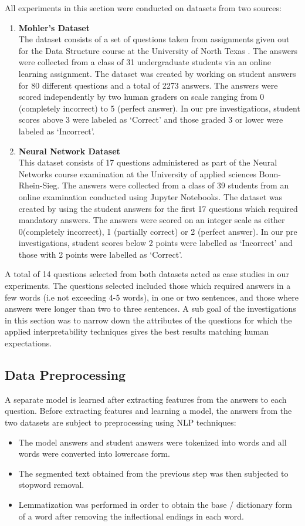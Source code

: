 \documentclass[letterpaper, 10 pt, conference]{ieeeconf}  %
\begin{document}
All experiments in this section were conducted on datasets from two sources:
\begin{enumerate}
\item \textbf{Mohler's Dataset}\\
The dataset consists of a set of questions taken from assignments given out for the Data Structure course at the University of North Texas \cite{mohler2011learning}. The answers were collected from a class of 31 undergraduate students via an online learning assignment. The dataset was created by working on student answers for 80 different questions and a total of 2273 answers. The answers were scored independently by two human graders on scale ranging from 0 (completely incorrect) to 5 (perfect answer). In our pre investigations, student scores above 3 were labeled as `Correct' and those graded 3 or lower were labeled as `Incorrect'. 
\item \textbf{Neural Network Dataset}\\
This dataset consists of 17 questions administered as part of the Neural Networks course examination at the University of applied sciences Bonn-Rhein-Sieg. The answers were collected from a class of 39 students from an online examination conducted using Jupyter Notebooks. The dataset was created by using the student answers for the first 17 questions which required mandatory answers. The answers were scored on an integer scale as either 0(completely incorrect), 1 (partially correct) or 2 (perfect answer). In our pre investigations, student scores below 2 points were labelled as `Incorrect' and those with 2 points were labelled as `Correct'.
\end{enumerate}
A total of 14 questions selected from both datasets acted as case studies in our experiments. The questions selected included those which required answers in a few words (i.e not exceeding 4-5 words), in one or two sentences, and those where answers were longer than two to three sentences. A sub goal of the investigations in this section was to narrow down the attributes of the questions for which the applied interpretability techniques gives the best results matching human expectations.
\subsection{Data Preprocessing}
A separate model is learned after extracting features from the answers to each question. Before extracting features and learning a model, the answers from the two datasets are subject to preprocessing using NLP techniques:
\begin{itemize}
\item The model answers and student answers were tokenized into words and all words were converted into lowercase form.
\item The segmented text obtained from the previous step was then subjected to stopword removal.
\item Lemmatization was performed in order to obtain the base / dictionary form of a word after removing the inflectional endings in each word.
\end{itemize}
\end{document}
